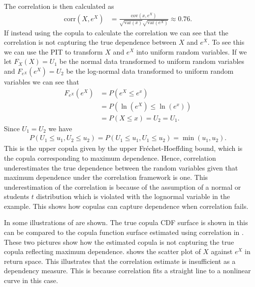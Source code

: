 \begin{example}
    The correlation is then calculated as
    \begin{align*}
        \mathrm{corr}(X,e^X) &= \frac{\mathrm{cov}(x,e^X)}{\sqrt{\mathrm{var}(x)} \sqrt{\mathrm{var}(e^X)}}  \approx 0.76. 
    \end{align*}
    If instead using the copula to calculate the correlation we can see that the correlation is not capturing the true dependence between $X$ and $e^X$. To see this we can use the \gls{PIT} to transform $X$ and $e^X$ into uniform random variables. If we let $F_X(X)=U_1$ be the normal data transformed to uniform random variables and $F_{e^X}(e^X)=U_2$ be the log-normal data transformed to uniform random variables we can see that 
    \begin{align*}
        F_{e^X}(e^X) &= P(e^X \leq e^x)\\
        &= P(\ln(e^X) \leq \ln (e^x))\\
        &=P(X\leq x) = U_2 = U_1.
    \end{align*}
    Since $U_1 = U_2$ we have 
    \begin{align*}
        P(U_1\leq u_1, U_2\leq u_2) = P(U_1\leq u_1, U_1\leq u_2) = \min(u_1,u_2).
    \end{align*}
    This is the upper copula given by the upper Fréchet-Hoeffding bound, which is the copula corresponding to maximum dependence. Hence, correlation underestimates the true dependence between the random variables given that maximum dependence under the correlation framework is one. This underestimation of the correlation is because of the assumption of a normal or students $t$ distribution which is violated with the lognormal variable in the example. This shows how copulas can capture dependence when correlation fails. 

    In  some illustrations of  are shown. The true copula \gls{CDF} surface is shown in  this can be compared to the copula function surface estimated using correlation in . These two pictures show how the estimated copula is not capturing the true copula reflecting maximum dependence. 
     shows the scatter plot of $X$ against $e^X$ in return space. This illustrates that the correlation estimate is insufficient as a dependency measure. This is because correlation fits a straight line to a nonlinear curve in this case. 
    

\end{example}
